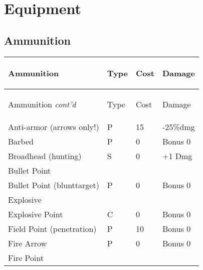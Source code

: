 \documentclass[twoside]{book}
\begin{document}
\begin{multicols}{2}
    


\hspace{-2ex}
\vspace{1ex}


    


\hspace{-2ex}
\vspace{1ex}


    
\end{multicols}
  
    

\chapter{Equipment}
    
    

\section{Ammunition}
    
\begin{longtable}{p{1.25in}lll} 
  Ammunition& \begin{turn}{70}{Type}\end{turn}
          & \begin{turn}{70}{Cost}\end{turn}
          & \begin{turn}{70}{Damage}\end{turn}
          \\
  \hline
  \hline
  \endfirsthead
  Ammunition \textit{cont'd}
        & \begin{turn}{70}{Type}\end{turn}
          & \begin{turn}{70}{Cost}\end{turn}
          & \begin{turn}{70}{Damage}\end{turn}
           \\
  \hline
  \endhead
\raggedright Anti-armor (arrows only!)&P&15&-25\%dmg\tabularnewline
      \raggedright Barbed&P&0&Bonus 0\tabularnewline
      \raggedright Broadhead (hunting)&S&0&+1 Dmg\tabularnewline
      \raggedright Bullet Point&&&\tabularnewline
      \raggedright Bullet Point (blunttarget)&P&0&Bonus 0\tabularnewline
      \raggedright Explosive&&&\tabularnewline
      \raggedright Explosive Point&C&0&Bonus 0\tabularnewline
      \raggedright Field Point (penetration)&P&10&Bonus 0\tabularnewline
      \raggedright Fire Arrow&P&0&Bonus 0\tabularnewline
      \raggedright Fire Point&&&\tabularnewline
      
\end{longtable}
    
\end{document}
